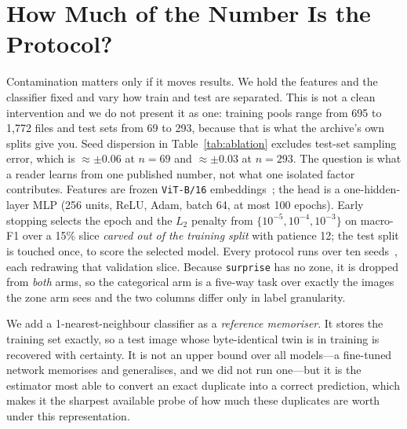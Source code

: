 \documentclass[conference,10pt]{IEEEtran}
\begin{document}
\section{How Much of the Number Is the Protocol?}
\label{sec:ablation}
Contamination matters only if it moves results. We hold the features and the
classifier fixed and vary how train and test are separated. This is not a clean intervention and we do not present
it as one: training pools range from 695 to 1{,}772 files and test sets from 69
to 293, because that is what the archive's own splits give you. Seed dispersion
in Table~\ref{tab:ablation} excludes test-set sampling error, which is
${\approx}\pm0.06$ at $n=69$ and ${\approx}\pm0.03$ at $n=293$. The question is
what a reader learns from one published number, not what one isolated factor
contributes. Features are frozen \texttt{ViT-B/16}
embeddings~\cite{dosovitskiy2021}; the head is a one-hidden-layer MLP (256
units, ReLU, Adam, batch 64, at most 100 epochs). Early stopping selects the
epoch and the $L_2$ penalty from $\{10^{-5},10^{-4},10^{-3}\}$ on macro-F1 over
a 15\% slice \emph{carved out of the training split} with patience 12; the test
split is touched once, to score the selected model. Every protocol runs over ten
seeds~\cite{bouthillier2021}, each redrawing that validation slice. Because \texttt{surprise} has no zone, it is
dropped from \emph{both} arms, so the categorical arm is a five-way task over
exactly the images the zone arm sees and the two columns differ only in label
granularity.

We add a 1-nearest-neighbour classifier as a \emph{reference memoriser}. It
stores the training set exactly, so a test image whose byte-identical twin is in
training is recovered with certainty. It is not an upper bound over all models---a
fine-tuned network memorises and generalises, and we did not run one---but it is
the estimator most able to convert an exact duplicate into a correct prediction,
which makes it the sharpest available probe of how much these duplicates are
worth under this representation.
\end{document}
